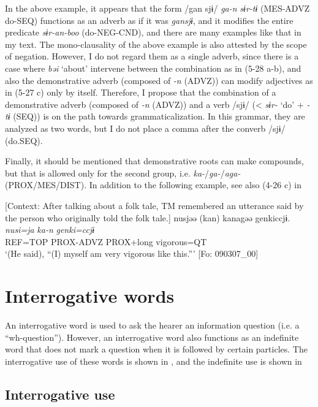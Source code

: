 In the above example, it appears that the form /gan sjɨ/ \textit{ga-n} \textit{sɨr-tɨ} (MES-ADVZ do-SEQ) functions as an adverb as if it was \textit{gansjɨ}, and it modifies the entire predicate \textit{sɨr-an-boo} (do-NEG-CND), and there are many examples like that in my text. The mono-clausality of the above example is also attested by the scope of negation. However, I do not regard them as a single adverb, since there is a case where \textit{bəi} ‘about’ intervene between the combination as in (5-28 a-b), and also the demonstrative adverb (composed of \textit{{}-n} (ADVZ)) can modify adjectives as in (5-27 c) only by itself. Therefore, I propose that the combination of a demonstrative adverb (composed of \textit{{}-n} (ADVZ)) and a verb /sjɨ/ (< \textit{sɨr-} ‘do’ + \textit{{}-tɨ} (SEQ)) is on the path towards grammaticalization. In this grammar, they are analyzed as two words, but I do not place a comma after the converb /sjɨ/ (do.SEQ).

  Finally, it should be mentioned that demonstrative roots can make compounds, but that is allowed only for the second group, i.e. \textit{ka-}/\textit{ga-}/\textit{aga-} (PROX/MES/DIST). In addition to the following example, see also (4-26 c) in 

\ea \label{ex:5:30}   [Context: After talking about a folk tale, TM remembered an utterance said by the person who originally told the folk tale.]
\glll  nusjəə  (kan)  kanagəə  {\textbar}genki{\textbar}ccjɨ.\\
\textit{nusi=ja}  \textit{ka-n}  \textit{}  \textit{genki=ccjɨ}\\
REF=TOP  PROX-ADVZ  PROX+long  vigorous=QT\\
\glt ‘(He said), “(I) myself am very vigorous like this.”’ [Fo: 090307\_00]
\z

\section{Interrogative words}
\label{bkm:Ref367267321}
An interrogative word is used to ask the hearer an information question (i.e. a “wh-question”). However, an interrogative word also functions as an indefinite word that does not mark a question when it is followed by certain particles. The interrogative use of these words is shown in , and the indefinite use is shown in 

\subsection{Interrogative use}

